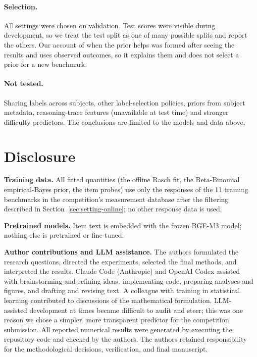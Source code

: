 \paragraph{Selection.} All settings were chosen on validation. Test scores were visible during development, so we treat the test split as one of many possible splits and report the others. Our account of when the prior helps was formed after seeing the results and uses observed outcomes, so it explains them and does not select a prior for a new benchmark.

\paragraph{Not tested.} Sharing labels across subjects, other label-selection policies, priors from subject metadata, reasoning-trace features (unavailable at test time) and stronger difficulty predictors. The conclusions are limited to the models and data above.

\section{Disclosure}
\label{sec:disclosure-rerun}
\textbf{Training data.} All fitted quantities (the offline Rasch fit, the Beta-Binomial
empirical-Bayes prior, the item probes) use only the responses of the 11 training benchmarks in
the competition's measurement database after the filtering described in Section~\ref{sec:setting-online};
no other response data is used.

\textbf{Pretrained models.} Item text is embedded with the frozen
BGE-M3 model; nothing else is pretrained or fine-tuned.

\textbf{Author contributions and LLM assistance.} The authors formulated the research questions,
directed the experiments, selected the final methods, and interpreted the results. Claude Code
(Anthropic) and OpenAI Codex assisted with brainstorming and refining ideas, implementing code,
preparing analyses and figures, and drafting and revising text. A colleague with training in
statistical learning contributed to discussions of the mathematical formulation. LLM-assisted
development at times became difficult to audit and steer; this was one reason we chose a simpler,
more transparent predictor for the competition submission. All reported numerical results were
generated by executing the repository code and checked by the authors. The authors retained
responsibility for the methodological decisions, verification, and final manuscript.

